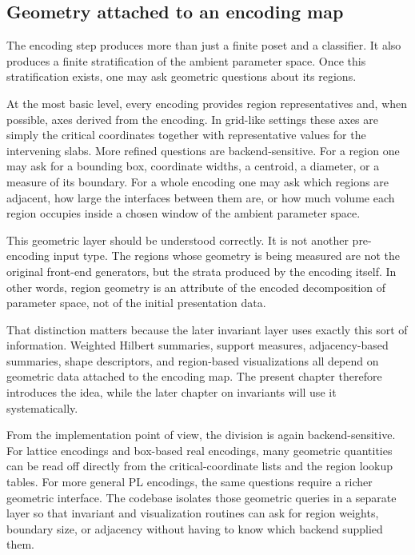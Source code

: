 \documentclass[11pt]{article}
\theoremstyle{definition}
\theoremstyle{remark}
\begin{document}
\subsection{Geometry attached to an encoding map}
\label{subsec:encoding-geometry}

The encoding step produces more than just a finite poset and a classifier.  It also produces a finite stratification of the ambient parameter space.  Once this stratification exists, one may ask geometric questions about its regions.

At the most basic level, every encoding provides region representatives and, when possible, axes derived from the encoding.  In grid-like settings these axes are simply the critical coordinates together with representative values for the intervening slabs.  More refined questions are backend-sensitive.  For a region one may ask for a bounding box, coordinate widths, a centroid, a diameter, or a measure of its boundary.  For a whole encoding one may ask which regions are adjacent, how large the interfaces between them are, or how much volume each region occupies inside a chosen window of the ambient parameter space.

This geometric layer should be understood correctly.  It is not another pre-encoding input type.  The regions whose geometry is being measured are not the original front-end generators, but the strata produced by the encoding itself.  In other words, region geometry is an attribute of the encoded decomposition of parameter space, not of the initial presentation data.

That distinction matters because the later invariant layer uses exactly this sort of information.  Weighted Hilbert summaries, support measures, adjacency-based summaries, shape descriptors, and region-based visualizations all depend on geometric data attached to the encoding map.  The present chapter therefore introduces the idea, while the later chapter on invariants will use it systematically.

From the implementation point of view, the division is again backend-sensitive.  For lattice encodings and box-based real encodings, many geometric quantities can be read off directly from the critical-coordinate lists and the region lookup tables.  For more general PL encodings, the same questions require a richer geometric interface.  The codebase isolates those geometric queries in a separate layer so that invariant and visualization routines can ask for region weights, boundary size, or adjacency without having to know which backend supplied them.
\end{document}
